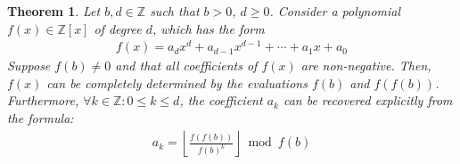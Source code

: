 \documentclass[11pt,reqno]{article}
\theoremstyle{plain}
\newtheorem{theorem}{Theorem}
\theoremstyle{definition}
\newcommand{\floor}[1]{\left\lfloor #1 \right\rfloor}
\begin{document}
\begin{theorem} \label{theorem:encoding}
Let $b, d \in \mathbb{Z}$ such that $b > 0$, $d \geq 0$. Consider a polynomial $f(x) \in \mathbb{Z}[x]$ of degree $d$, which has the form
\begin{align*}
    f(x) = a_d x^d + a_{d-1} x^{d-1} + \cdots + a_1 x + a_0
\end{align*}
Suppose $f(b) \not= 0$ and that all coefficients of $f(x)$ are non-negative. Then, $f(x)$ can be completely determined by the evaluations $f(b)$ and $f(f(b))$. Furthermore, $\forall k \in \mathbb{Z} : 0 \leq k \leq d$, the coefficient $a_k$ can be recovered explicitly from the formula:
\begin{align*}
a_k = \floor{\frac{f(f(b))}{f(b)^{k}}} \bmod{f(b)}
\end{align*}
\end{theorem}
\end{document}
